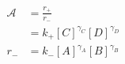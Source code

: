 \begin{eqnarray}
\mathcal{A} &= \frac{r_+}{r_-} \\
& =  k_+[C]^{\gamma_C}[D]^{\gamma_D} \\
r_-  & =  k_-[A]^{\gamma_A}[B]^{\gamma_B} \\
\end{eqnarray}